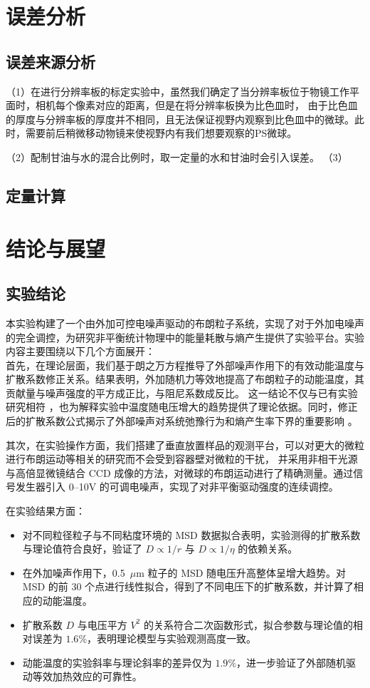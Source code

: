 \documentclass[a4paper]{report} %
\begin{document}
\chapter{误差分析}
\section{误差来源分析}
（1）在进行分辨率板的标定实验中，虽然我们确定了当分辨率板位于物镜工作平面时，相机每个像素对应的距离，但是在将分辨率板换为比色皿时，
由于比色皿的厚度与分辨率板的厚度并不相同，且无法保证视野内观察到比色皿中的微球。此时，需要前后稍微移动物镜来使视野内有我们想要观察的PS微球。 \par
（2）配制甘油与水的混合比例时，取一定量的水和甘油时会引入误差。
（3）
\section{定量计算}

\chapter{结论与展望}
\section{实验结论}
本实验构建了一个由外加可控电噪声驱动的布朗粒子系统，实现了对于外加电噪声的完全调控，为研究非平衡统计物理中的能量耗散与熵产生提供了实验平台。实验内容主要围绕以下几个方面展开：\\

首先，在理论层面，我们基于朗之万方程推导了外部噪声作用下的有效动能温度与扩散系数修正关系。结果表明，外加随机力等效地提高了布朗粒子的动能温度，其贡献量与噪声强度的平方成正比，与阻尼系数成反比。
这一结论不仅与已有实验研究相符 \cite{Martinez2013,Roldan2014}，也为解释实验中温度随电压增大的趋势提供了理论依据。同时，修正后的扩散系数公式揭示了外部噪声对系统弛豫行为和熵产生率下界的重要影响 \cite{Leighton2024}。\par

其次，在实验操作方面，我们搭建了垂直放置样品的观测平台，可以对更大的微粒进行布朗运动等相关的研究而不会受到容器壁对微粒的干扰，
并采用非相干光源与高倍显微镜结合 CCD 成像的方法，对微球的布朗运动进行了精确测量。通过信号发生器引入 0--10V 的可调电噪声，实现了对非平衡驱动强度的连续调控。\par

在实验结果方面：\par
\begin{itemize}
    \item 对不同粒径粒子与不同粘度环境的 MSD 数据拟合表明，实验测得的扩散系数与理论值符合良好，验证了 $D \propto 1/r$ 与 $D \propto 1/\eta$ 的依赖关系。
    \item 在外加噪声作用下，0.5~$\mu$m 粒子的 MSD 随电压升高整体呈增大趋势。对 MSD 的前 30 个点进行线性拟合，得到了不同电压下的扩散系数，并计算了相应的动能温度。
    \item 扩散系数 $D$ 与电压平方 $V^2$ 的关系符合二次函数形式，拟合参数与理论值的相对误差为 $1.6\%$，表明理论模型与实验观测高度一致。
    \item 动能温度的实验斜率与理论斜率的差异仅为 $1.9\%$，进一步验证了外部随机驱动等效加热效应的可靠性。
\end{itemize}
\end{document}
